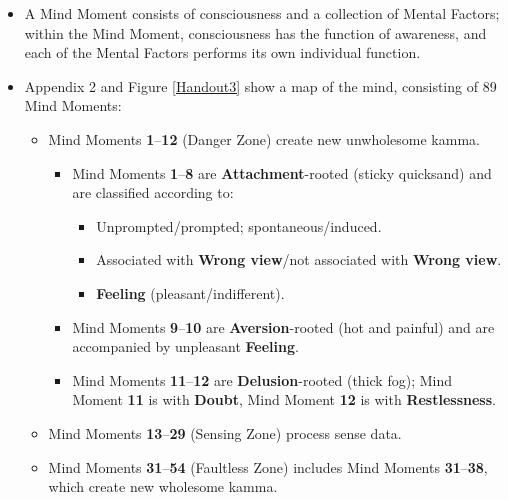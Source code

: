 \begin{itemize}

\item A Mind Moment consists of consciousness and a collection of Mental Factors; within the Mind Moment, consciousness has the function of awareness, and each of the Mental Factors performs its own individual function.

\item Appendix 2 and Figure \ref{Handout3} show a map of the mind, consisting of 89 Mind Moments:

\begin{itemize}

\item Mind Moments \textbf{1}--\textbf{12} (Danger Zone) create new unwholesome kamma.

\begin{itemize}

\item Mind Moments \textbf{1}--\textbf{8} are \textbf{Attachment}-rooted (sticky quicksand) and are classified according to:

\begin{itemize}

\item Unprompted/prompted; spontaneous/induced.

\item Associated with \textbf{Wrong view}/not associated with \textbf{Wrong view}.

\item \textbf{Feeling} (pleasant/indifferent).

\end{itemize}

\item Mind Moments \textbf{9}--\textbf{10} are \textbf{Aversion}-rooted (hot and painful) and are accompanied by unpleasant \textbf{Feeling}.

\item Mind Moments \textbf{11}--\textbf{12} are \textbf{Delusion}-rooted (thick fog); Mind Moment \textbf{11} is with \textbf{Doubt}, Mind Moment \textbf{12} is with \textbf{Restlessness}.

\end{itemize}

\item Mind Moments \textbf{13}--\textbf{29} (Sensing Zone) process sense data.

\item Mind Moments \textbf{31}--\textbf{54} (Faultless Zone) includes Mind Moments \textbf{31}--\textbf{38}, which create new wholesome kamma.


\end{itemize}
\end{itemize}
